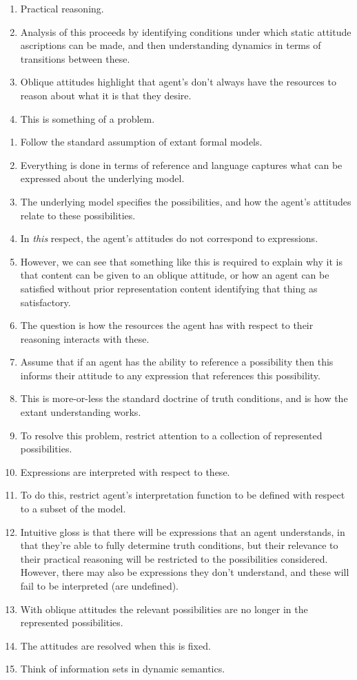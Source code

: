 \documentclass[10pt]{article}
\begin{document}
\newpage

\begin{enumerate}
\item Practical reasoning.
\item Analysis of this proceeds by identifying conditions under which static attitude ascriptions can be made, and then understanding dynamics in terms of transitions between these.
\item Oblique attitudes highlight that agent's don't always have the resources to reason about what it is that they desire.
\item This is something of a problem.
\end{enumerate}

\begin{enumerate}
\item Follow the standard assumption of extant formal models.
\item Everything is done in terms of reference and language captures what can be expressed about the underlying model.
\item The underlying model specifies the possibilities, and how the agent's attitudes relate to these possibilities.
\item In \emph{this} respect, the agent's attitudes do not correspond to expressions.
\item However, we can see that something like this is required to explain why it is that content can be given to an oblique attitude, or how an agent can be satisfied without prior representation content identifying that thing as satisfactory.
\item The question is how the resources the agent has with respect to their reasoning interacts with these.
\item Assume that if an agent has the ability to reference a possibility then this informs their attitude to any expression that references this possibility.
\item This is more-or-less the standard doctrine of truth conditions, and is how the extant understanding works.
\item To resolve this problem, restrict attention to a collection of represented possibilities.
\item Expressions are interpreted with respect to these.
\item To do this, restrict agent's interpretation function to be defined with respect to a subset of the model.
\item Intuitive gloss is that there will be expressions that an agent understands, in that they're able to fully determine truth conditions, but their relevance to their practical reasoning will be restricted to the possibilities considered.
  However, there may also be expressions they don't understand, and these will fail to be interpreted (are undefined).
\item With oblique attitudes the relevant possibilities are no longer in the represented possibilities.
\item The attitudes are resolved when this is fixed.
\item Think of information sets in dynamic semantics.
\end{enumerate}
\end{document}
